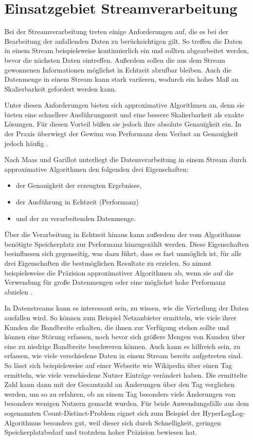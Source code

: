 \section{Einsatzgebiet Streamverarbeitung}
Bei der Streamverarbeitung treten einige Anforderungen auf, 
die es bei der Bearbeitung der anfallenden Daten zu berücksichtigen gilt. 
So treffen die Daten in einem Stream beispielsweise kontinuierlich ein 
und sollten abgearbeitet werden, bevor die nächsten Daten eintreffen. 
Außerdem sollen die aus dem Stream gewonnenen Informationen möglichst in Echtzeit abrufbar bleiben.
Auch die Datenmenge in einem Stream kann stark variieren, wodurch ein hohes Maß an Skalierbarkeit gefordert werden kann.

Unter diesen Anforderungen bieten sich approximative Algorithmen an, denn sie bieten eine schnellere Ausführungszeit und eine bessere Skalierbarkeit als exakte Lösungen. 
Für diesen Vorteil büßen sie jedoch ihre absolute Genauigkeit ein. 
In der Praxis überwiegt der Gewinn von Performanz dem Verlust an Genauigkeit jedoch häufig \cite{maas2019}. 

Nach Maas und Garillot \cite{maas2019} unterliegt die Datenverarbeitung in einem Stream durch approximative Algorithmen den folgenden drei Eigenschaften:  

\begin{itemize}
\item der Genauigkeit der erzeugten Ergebnisse,
\item der Ausführung in Echtzeit (Performanz)
\item und der zu verarbeitenden Datenmenge.
\end{itemize}

Über die Verarbeitung in Echtzeit hinaus kann außerdem der vom Algorithmus benötigte Speicherplatz zur Performanz hinzugezählt werden.
Diese Eigenschaften beeinflussen sich gegenseitig, was dazu führt, 
dass es fast unmöglich ist, für alle drei Eigenschaften die bestmöglichen Resultate zu erzielen.
So nimmt beispielsweise die Präzision approximativer Algorithmen ab, 
wenn sie auf die Verwendung für große Datenmengen oder eine möglichst hohe Performanz abzielen \cite{maas2019}.

In Datenstreams kann es interessant sein, zu wissen, 
wie die Verteilung der Daten ausfallen wird. 
So können zum Beispiel Netzanbieter ermitteln, 
wie viele ihrer Kunden die Bandbreite erhalten, die ihnen zur Verfügung stehen sollte 
und können eine Störung erfassen, 
noch bevor sich größere Mengen von Kunden über eine zu niedrige Bandbreite beschweren können.
Auch kann es hilfreich sein, zu erfassen, 
wie viele verschiedene Daten in einem Stream bereits aufgetreten sind. 
So lässt sich beispielsweise auf einer Webseite wie Wikipedia über einen Tag ermitteln, wie viele verschiedene Nutzer Einträge verändert haben.
Die ermittelte Zahl kann dann mit der Gesamtzahl an Änderungen über den Tag verglichen werden, 
um so zu erfahren, ob an einem Tag besonders viele Änderungen von besonders wenigen Nutzern gemacht wurden.
Für beide Anwendungsfälle aus dem sogenannten Count-Distinct-Problem eignet sich zum Beispiel der HyperLogLog-Algorithmus besonders gut, 
weil dieser sich durch Schnelligkeit, geringen Speicherplatzbedarf und trotzdem hoher Präzision bewiesen hat.